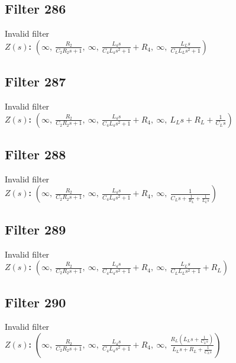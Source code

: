 \documentclass{article}
\begin{document}
\subsection*{Filter 286}
Invalid filter \\ 
\textbf{$Z(s)$:} $\left( \infty, \  \frac{R_{2}}{C_{2} R_{2} s + 1}, \  \infty, \  \frac{L_{4} s}{C_{4} L_{4} s^{2} + 1} + R_{4}, \  \infty, \  \frac{L_{L} s}{C_{L} L_{L} s^{2} + 1}\right)$ \\ 
\subsection*{Filter 287}
Invalid filter \\ 
\textbf{$Z(s)$:} $\left( \infty, \  \frac{R_{2}}{C_{2} R_{2} s + 1}, \  \infty, \  \frac{L_{4} s}{C_{4} L_{4} s^{2} + 1} + R_{4}, \  \infty, \  L_{L} s + R_{L} + \frac{1}{C_{L} s}\right)$ \\ 
\subsection*{Filter 288}
Invalid filter \\ 
\textbf{$Z(s)$:} $\left( \infty, \  \frac{R_{2}}{C_{2} R_{2} s + 1}, \  \infty, \  \frac{L_{4} s}{C_{4} L_{4} s^{2} + 1} + R_{4}, \  \infty, \  \frac{1}{C_{L} s + \frac{1}{R_{L}} + \frac{1}{L_{L} s}}\right)$ \\ 
\subsection*{Filter 289}
Invalid filter \\ 
\textbf{$Z(s)$:} $\left( \infty, \  \frac{R_{2}}{C_{2} R_{2} s + 1}, \  \infty, \  \frac{L_{4} s}{C_{4} L_{4} s^{2} + 1} + R_{4}, \  \infty, \  \frac{L_{L} s}{C_{L} L_{L} s^{2} + 1} + R_{L}\right)$ \\ 
\subsection*{Filter 290}
Invalid filter \\ 
\textbf{$Z(s)$:} $\left( \infty, \  \frac{R_{2}}{C_{2} R_{2} s + 1}, \  \infty, \  \frac{L_{4} s}{C_{4} L_{4} s^{2} + 1} + R_{4}, \  \infty, \  \frac{R_{L} \left(L_{L} s + \frac{1}{C_{L} s}\right)}{L_{L} s + R_{L} + \frac{1}{C_{L} s}}\right)$ \\ 
\end{document}
